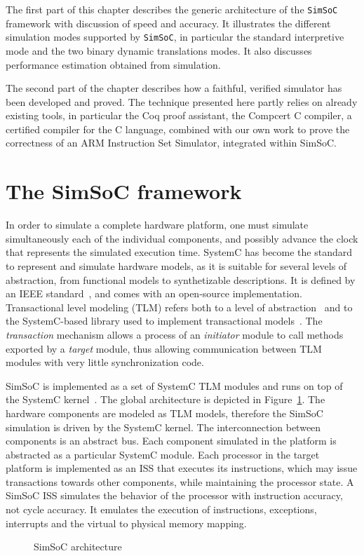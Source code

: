 \documentclass{llncs}
\newcommand{\simsoc}{\texttt{SimSoC}\xspace}
\newcommand{\insertfig}[1]{}
\begin{document}
The first part of this chapter describes the generic architecture of
the \simsoc framework with discussion of speed and accuracy. It
illustrates the different simulation modes supported by \simsoc, in
particular the standard interpretive mode and the two binary dynamic
translations modes. It also discusses performance estimation obtained
from simulation.

The second part of the chapter describes how a faithful, verified
simulator has been developed and proved. The technique presented here
partly relies on already existing tools, in particular the Coq proof
assistant, the Compcert C compiler, a certified compiler for the C
language, combined with our own work to prove the correctness of an
ARM Instruction Set Simulator, integrated within SimSoC.

\section{The SimSoC framework}

In order to simulate a complete hardware platform, one must simulate
simultaneously each of the individual components, and possibly advance
the clock that represents the simulated execution time. SystemC has
become the standard to represent and simulate hardware models, as it
is suitable for several levels of abstraction, from functional models
to synthetizable descriptions. It is defined by an IEEE
standard~\cite{systemc-lrm}, and comes with an open-source
implementation.  Transactional level modeling (TLM) refers both to a
level of abstraction~\cite{tlm-book} and to the SystemC-based library
used to implement transactional models~\cite{tlm-osci}. The
\emph{transaction} mechanism allows a process of an {\em initiator}
module to call methods exported by a {\em target} module, thus
allowing communication between TLM modules with very little
synchronization code.

SimSoC is implemented as a set of SystemC TLM modules and runs on top
of the SystemC kernel~\cite{apccas-2008}. The global architecture is
depicted in Figure~\ref{fig:simsoc-arch}. The hardware components are
modeled as TLM models, therefore the SimSoC simulation is driven by
the SystemC kernel.  The interconnection between components is an
abstract bus.  Each component simulated in the platform is abstracted
as a particular SystemC module. Each processor in the target platform
is implemented as an ISS that executes its instructions, which may
issue transactions towards other components, while maintaining the
processor state. A SimSoC ISS simulates the behavior of the processor
with instruction accuracy, not cycle accuracy. It emulates the
execution of instructions, exceptions, interrupts and the virtual to
physical memory mapping.
\begin{figure}[tbhp]
\centering
\scalebox{.5}{\insertfig{fig/simsoc_archi} }
\caption{SimSoC architecture}
\label{fig:simsoc-arch}
\end{figure}
\end{document}

